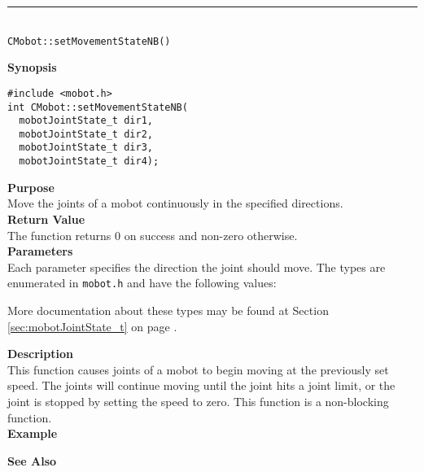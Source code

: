 \noindent
\vspace{5pt}
\rule{4.5in}{0.015in}\\
\noindent
{\LARGE \texttt{CMobot::setMovementStateNB()}}\\
{}

\noindent
{\bf Synopsis}
\vspace{-8pt}
\begin{verbatim}
#include <mobot.h>
int CMobot::setMovementStateNB(
  mobotJointState_t dir1, 
  mobotJointState_t dir2, 
  mobotJointState_t dir3, 
  mobotJointState_t dir4);
\end{verbatim}

\noindent
{\bf Purpose}\\
Move the joints of a mobot continuously in the specified directions.\\

\noindent
{\bf Return Value}\\
The function returns 0 on success and non-zero otherwise.\\

\noindent
{\bf Parameters}\\
Each parameter specifies the direction the joint should move. The types
are enumerated in \texttt{mobot.h} and have the following values:

More documentation about these types may be found at Section
\ref{sec:mobotJointState_t} on page
\pageref{sec:mobotJointState_t}.

\noindent
{\bf Description}\\
This function causes joints of a mobot to begin moving at the previously set
speed. The joints will continue moving until the joint hits a joint limit, or
the joint is stopped by setting the speed to zero. This function is a non-blocking
function.\\

\noindent
{\bf Example}\\
\noindent

\noindent
{\bf See Also}\\

